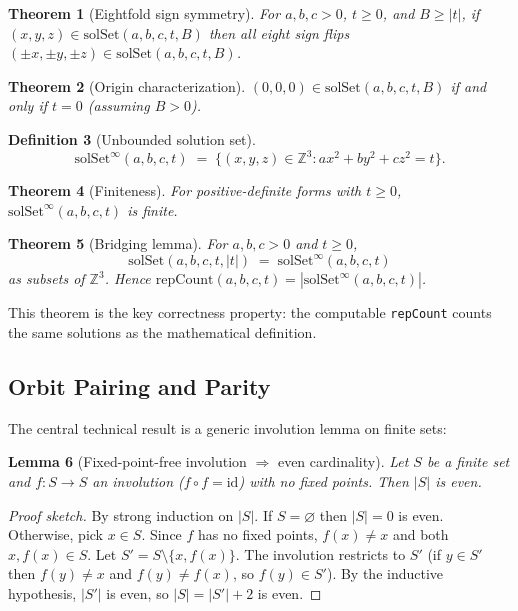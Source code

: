 \documentclass[11pt,a4paper]{article}
\newtheorem{theorem}{Theorem}[section]
\newtheorem{lemma}[theorem]{Lemma}
\theoremstyle{definition}
\newtheorem{definition}[theorem]{Definition}
\newcommand{\Z}{\mathbb{Z}}
\newcommand{\lean}[1]{\texttt{#1}}
\newcommand{\solSet}{\mathrm{solSet}}
\newcommand{\repCount}{\mathrm{repCount}}
\newcommand{\solSetInf}{\mathrm{solSet}^{\infty}}
\begin{document}
\begin{theorem}[Eightfold sign symmetry]\label{thm:sign-sym}
For $a, b, c > 0$, $t \ge 0$, and $B \ge |t|$, if
$(x,y,z) \in \solSet(a,b,c,t,B)$ then all eight sign flips
$(\pm x, \pm y, \pm z) \in \solSet(a,b,c,t,B)$.
\end{theorem}

\begin{theorem}[Origin characterization]\label{thm:origin}
$(0,0,0) \in \solSet(a,b,c,t,B)$ if and only if $t = 0$ (assuming $B > 0$).
\end{theorem}

\begin{definition}[Unbounded solution set]
\[
  \solSetInf(a,b,c,t) \;=\;
  \bigl\{(x,y,z) \in \Z^3 : ax^2 + by^2 + cz^2 = t\bigr\}.
\]
\end{definition}

\begin{theorem}[Finiteness]\label{thm:finite}
For positive-definite forms with $t \ge 0$,
$\solSetInf(a,b,c,t)$ is finite.
\end{theorem}

\begin{theorem}[Bridging lemma]\label{thm:bridge}
For $a, b, c > 0$ and $t \ge 0$,
\[
  \solSet(a,b,c,t,|t|) \;=\; \solSetInf(a,b,c,t)
\]
as subsets of $\Z^3$.  Hence $\repCount(a,b,c,t) =
|\solSetInf(a,b,c,t)|$.
\end{theorem}

This theorem is the key correctness property: the computable
\lean{repCount} counts the same solutions as the mathematical
definition.

\subsection{Orbit Pairing and Parity}\label{sec:s4}

The central technical result is a generic involution lemma on finite
sets:

\begin{lemma}[Fixed-point-free involution $\Rightarrow$ even cardinality]
\label{lem:involution}
Let $S$ be a finite set and $f\colon S \to S$ an involution
($f \circ f = \mathrm{id}$) with no fixed points.  Then
$|S|$ is even.
\end{lemma}

\begin{proof}[Proof sketch]
By strong induction on $|S|$.  If $S = \varnothing$ then
$|S| = 0$ is even.  Otherwise, pick $x \in S$.  Since $f$ has no
fixed points, $f(x) \ne x$ and both $x, f(x) \in S$.  Let
$S' = S \setminus \{x, f(x)\}$.  The involution restricts to $S'$
(if $y \in S'$ then $f(y) \ne x$ and $f(y) \ne f(x)$, so
$f(y) \in S'$).  By the inductive hypothesis, $|S'|$ is even, so
$|S| = |S'| + 2$ is even.
\end{proof}
\end{document}
